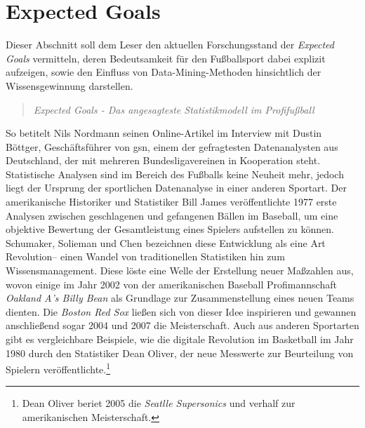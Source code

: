 \section{Expected Goals}
\label{goals}
Dieser Abschnitt soll dem Leser den aktuellen Forschungsstand der \textit{Expected Goals} vermitteln, deren Bedeutsamkeit für den Fußballsport dabei explizit aufzeigen, sowie den Einfluss von Data-Mining-Methoden hinsichtlich der Wissensgewinnung darstellen.

\begin{quote}
\textit{\glqq Expected Goals - Das angesagteste Statistikmodell im Profifußball\grqq}
\end{quote}

So betitelt Nils Nordmann seinen Online-Artikel im Interview mit Dustin Böttger, Geschäftsführer von \gls{gsn}, einem der gefragtesten Datenanalysten aus Deutschland, der mit mehreren Bundesligavereinen in Kooperation steht. Statistische Analysen sind im Bereich des Fußballs keine Neuheit mehr, jedoch liegt der Ursprung der sportlichen Datenanalyse in einer anderen Sportart. Der amerikanische Historiker und Statistiker Bill James veröffentlichte 1977 erste Analysen zwischen geschlagenen und gefangenen Bällen im Baseball, um eine objektive Bewertung der Gesamtleistung eines Spielers aufstellen zu können. Schumaker, Solieman und Chen bezeichnen diese Entwicklung als eine Art \glqq Revolution\grqq-- einen Wandel von traditionellen Statistiken hin zum Wissensmanagement. Diese löste eine Welle der Erstellung neuer Maßzahlen aus, wovon einige im Jahr 2002 von der amerikanischen Baseball Profimannschaft \textit{Oakland A’s Billy Bean} als Grundlage zur Zusammenstellung eines neuen Teams dienten. Die \textit{Boston Red Sox} ließen sich von dieser Idee inspirieren und  gewannen anschließend sogar 2004 und 2007 die Meisterschaft. Auch aus anderen Sportarten gibt es vergleichbare Beispiele, wie die digitale Revolution im Basketball im Jahr 1980 durch den Statistiker Dean Oliver, der neue Messwerte zur Beurteilung von Spielern veröffentlichte.\footnote{Dean Oliver beriet 2005 die \textit{Seatlle Supersonics} und verhalf zur amerikanischen Meisterschaft.}

